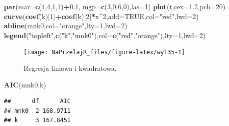 \documentclass[polish,]{book}
\newenvironment{Shaded}{\begin{snugshade}}{\end{snugshade}}
\newcommand{\DataTypeTok}[1]{\textcolor[rgb]{0.13,0.29,0.53}{#1}}
\newcommand{\DecValTok}[1]{\textcolor[rgb]{0.00,0.00,0.81}{#1}}
\newcommand{\FloatTok}[1]{\textcolor[rgb]{0.00,0.00,0.81}{#1}}
\newcommand{\KeywordTok}[1]{\textcolor[rgb]{0.13,0.29,0.53}{\textbf{#1}}}
\newcommand{\NormalTok}[1]{#1}
\newcommand{\OperatorTok}[1]{\textcolor[rgb]{0.81,0.36,0.00}{\textbf{#1}}}
\newcommand{\OtherTok}[1]{\textcolor[rgb]{0.56,0.35,0.01}{#1}}
\newcommand{\StringTok}[1]{\textcolor[rgb]{0.31,0.60,0.02}{#1}}
\begin{document}
\begin{Shaded}
\begin{Highlighting}[]
\KeywordTok{par}\NormalTok{(}\DataTypeTok{mar=}\KeywordTok{c}\NormalTok{(}\DecValTok{4}\NormalTok{,}\DecValTok{4}\NormalTok{,}\DecValTok{1}\NormalTok{,}\DecValTok{1}\NormalTok{)}\OperatorTok{+}\FloatTok{0.1}\NormalTok{, }\DataTypeTok{mgp=}\KeywordTok{c}\NormalTok{(}\DecValTok{3}\NormalTok{,}\FloatTok{0.6}\NormalTok{,}\DecValTok{0}\NormalTok{),}\DataTypeTok{las=}\DecValTok{1}\NormalTok{)}
\KeywordTok{plot}\NormalTok{(t,}\DataTypeTok{cex=}\FloatTok{1.2}\NormalTok{,}\DataTypeTok{pch=}\DecValTok{20}\NormalTok{)}
\KeywordTok{curve}\NormalTok{(}\KeywordTok{coef}\NormalTok{(k)[}\DecValTok{1}\NormalTok{]}\OperatorTok{+}\KeywordTok{coef}\NormalTok{(k)[}\DecValTok{2}\NormalTok{]}\OperatorTok{*}\NormalTok{x}\OperatorTok{^}\DecValTok{2}\NormalTok{,}\DataTypeTok{add=}\OtherTok{TRUE}\NormalTok{,}\DataTypeTok{col=}\StringTok{"red"}\NormalTok{,}\DataTypeTok{lwd=}\DecValTok{2}\NormalTok{)}
\KeywordTok{abline}\NormalTok{(mnk0,}\DataTypeTok{col=}\StringTok{"orange"}\NormalTok{,}\DataTypeTok{lty=}\DecValTok{1}\NormalTok{,}\DataTypeTok{lwd=}\DecValTok{2}\NormalTok{)}
\KeywordTok{legend}\NormalTok{(}\StringTok{"topleft"}\NormalTok{,}\KeywordTok{c}\NormalTok{(}\StringTok{"k"}\NormalTok{,}\StringTok{"mnk0"}\NormalTok{),}\DataTypeTok{col=}\KeywordTok{c}\NormalTok{(}\StringTok{"red"}\NormalTok{,}\StringTok{"orange"}\NormalTok{),}\DataTypeTok{lty=}\DecValTok{1}\NormalTok{,}\DataTypeTok{lwd=}\DecValTok{2}\NormalTok{)}
\end{Highlighting}
\end{Shaded}

\begin{figure}[h]

{\centering \texttt{[image: NaPrzelajR\_files/figure-latex/wy135-1]} 

}

\caption{Regresja liniowa i kwadratowa.}\label{fig:wy135}
\end{figure}

\begin{Shaded}
\begin{Highlighting}[]
\KeywordTok{AIC}\NormalTok{(mnk0,k)}
\end{Highlighting}
\end{Shaded}

\begin{verbatim}
##      df      AIC
## mnk0  2 168.9711
## k     3 167.8451
\end{verbatim}
\end{document}
